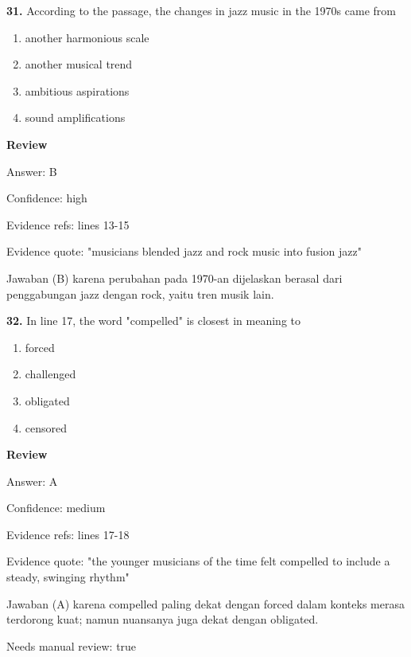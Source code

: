 \documentclass[12pt]{article}
\begin{document}
\endgroup
\par
\vspace{0.25\baselineskip}
\noindent\textbf{31.} According to the passage, the changes in jazz music in the 1970s came from
\begin{enumerate}[label=(\Alph*),leftmargin=*,itemsep=0.2em]
\item another harmonious scale
\item another musical trend
\item ambitious aspirations
\item sound amplifications
\end{enumerate}
\par
\begingroup
\setlength{\parskip}{0pt}
\setlength{\parindent}{0pt}
\textbf{Review}\par
Answer: B\par
Confidence: high\par
Evidence refs: lines 13-15\par
Evidence quote: "musicians blended jazz and rock music into fusion jazz"\par
Jawaban (B) karena perubahan pada 1970-an dijelaskan berasal dari penggabungan jazz dengan rock, yaitu tren musik lain.\par
\endgroup
\par
\vspace{0.25\baselineskip}
\noindent\textbf{32.} In line 17, the word "compelled" is closest in meaning to
\begin{enumerate}[label=(\Alph*),leftmargin=*,itemsep=0.2em]
\item forced
\item challenged
\item obligated
\item censored
\end{enumerate}
\par
\begingroup
\setlength{\parskip}{0pt}
\setlength{\parindent}{0pt}
\textbf{Review}\par
Answer: A\par
Confidence: medium\par
Evidence refs: lines 17-18\par
Evidence quote: "the younger musicians of the time felt compelled to include a steady, swinging rhythm"\par
Jawaban (A) karena compelled paling dekat dengan forced dalam konteks merasa terdorong kuat; namun nuansanya juga dekat dengan obligated.\par
Needs manual review: true\par
\end{document}
